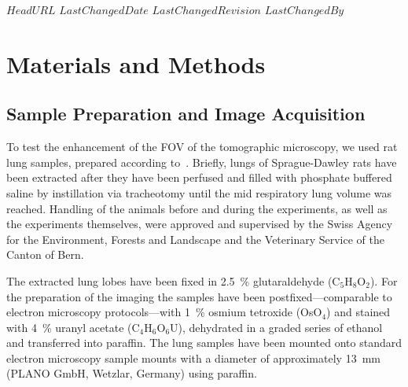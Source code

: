 \svnidlong
{$HeadURL$}
{$LastChangedDate$}
{$LastChangedRevision$}
{$LastChangedBy$}

\ifhtml
\else
\begin{center}
\end{center}
\fi

\section{Materials and Methods}
\label{sec:materials and methods}
\cbstart
\subsection{Sample Preparation and Image Acquisition}
To test the enhancement of the FOV of the tomographic microscopy, we used rat lung samples, prepared according to~\citet{Schittny1997,Schittny1998}. Briefly, lungs of Sprague-Dawley rats have been extracted after they have been perfused and filled with phosphate buffered saline by instillation via tracheotomy until the mid respiratory lung volume was reached. Handling of the animals before and during the experiments, as well as the experiments themselves, were approved and supervised by the Swiss Agency for the Environment, Forests and Landscape and the Veterinary Service of the Canton of Bern.

The extracted lung lobes have been fixed in \SI{2.5}{\percent} glutaraldehyde (C$_5$H$_8$O$_2$). For the preparation of the imaging the samples have been postfixed---comparable to electron microscopy protocols---with \SI{1}{\percent} osmium tetroxide (OsO$_4$) and stained with \SI{4}{\percent} uranyl acetate (C$_4$H$_6$O$_6$U), dehydrated in a graded series of ethanol and transferred into paraffin. The lung samples have been mounted onto standard electron microscopy sample mounts with a diameter of approximately \SI{13}{\milli\meter} (PLANO GmbH, Wetzlar, Germany) using paraffin.
\cbend

